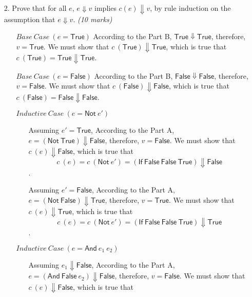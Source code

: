 \documentclass[a4paper,answers]{exam}
\begin{document}
\begin{itemize}
\item[2.] Prove that for all $e$, $e \Downarrow v$ implies $c(e) \Downarrow v$, by rule induction on the assumption that $e \Downarrow v$. \textit{(10 marks)}
\begin{solution}
    \small\begin{itemize}[leftmargin=*]
        \item[] $Base\ Case\ (e = \mathsf{True})$ According to the Part B, $\mathsf{True} \Downarrow \mathsf{True}$, therefore, $v = \mathsf{True}$. We must show that $c\ (\mathsf{True}) \Downarrow \mathsf{True}$, which is true that $c\ (\mathsf{True}) = \mathsf{True} \Downarrow \mathsf{True}$.
        \item[] $Base\ Case\ (e = \mathsf{False})$ According to the Part B, $\mathsf{False} \Downarrow \mathsf{False}$, therefore, $v = \mathsf{False}$. We must show that $c\ (\mathsf{False}) \Downarrow \mathsf{False}$, which is true that $c\ (\mathsf{False}) = \mathsf{False} \Downarrow \mathsf{False}$.
        \item[] $Inductive\ Case\ (e = \mathsf{Not}\ e')$
        \begin{itemize}[leftmargin=*]
            \item[] Assuming $e' = \mathsf{True}$, According to the Part A, $e = (\mathsf{Not}\ \mathsf{True}) \Downarrow \mathsf{False}$, therefore, $v = \mathsf{False}$. We must show that $c\ (e) \Downarrow \mathsf{False}$, which is true that $$c\ (e) = c\ (\mathsf{Not}\ e') = (\mathsf{If}\ \mathsf{False}\ \mathsf{False}\ \mathsf{True}) \Downarrow \mathsf{False}$$.
            \item[] Assuming $e' = \mathsf{False}$, According to the Part A, $e = (\mathsf{Not}\ \mathsf{False}) \Downarrow \mathsf{True}$, therefore, $v = \mathsf{True}$. We must show that $c\ (e) \Downarrow \mathsf{True}$, which is true that $$c\ (e) = c\ (\mathsf{Not}\ e') = (\mathsf{If}\ \mathsf{False}\ \mathsf{False}\ \mathsf{True}) \Downarrow \mathsf{True}$$.
        \end{itemize}
        \item[] $Inductive\ Case\ (e = \mathsf{And}\ e_1\ e_2)$
            \begin{itemize}[leftmargin=*]
                $$c\ (e) = c\ (\mathsf{And}\ e_1\ e_2) = \mathsf{If}\ \mathsf{e_1}\ (\mathsf{If}\ e_2\ \mathsf{True}\ \mathsf{False})\ \mathsf{False}$$\\
                \item[] Assuming $e_1 \Downarrow \mathsf{False}$, According to the Part A, $e = (\mathsf{And\ False}\ e_2) \Downarrow \mathsf{False}$, therefore, $v = \mathsf{False}$. We must show that $c\ (e) \Downarrow \mathsf{False}$, which is true that \begin{gather*}

\end{gather*}
\end{itemize}
\end{itemize}
\end{solution}
\end{itemize}
\end{document}
